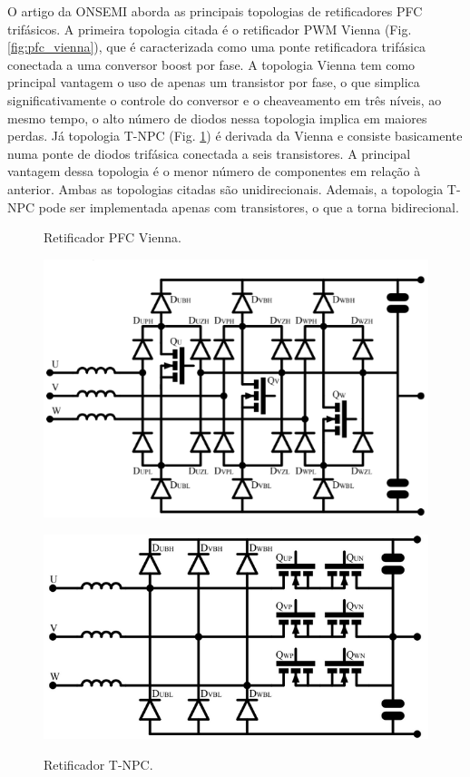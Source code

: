 O artigo da ONSEMI \cite{onsemi_h2ptoday2102} aborda as principais topologias de retificadores
PFC trifásicos. A primeira topologia citada é o retificador PWM Vienna (Fig.
\ref{fig:pfc_vienna}), que é caracterizada como uma ponte retificadora trifásica conectada a
uma conversor boost por fase. A topologia Vienna tem como principal vantagem o uso de apenas um
transistor por fase, o que simplica significativamente o controle do conversor e o cheaveamento
em três níveis, ao mesmo tempo, o alto número de diodos nessa topologia implica em maiores
perdas. Já topologia T-NPC (Fig. \ref{fig:pfc_tnpc}) é derivada da Vienna e consiste
basicamente numa ponte de diodos trifásica conectada a seis transistores. A principal vantagem
dessa topologia é o menor número de componentes em relação à anterior. Ambas as topologias
citadas são unidirecionais. Ademais, a topologia T-NPC pode ser implementada apenas com
transistores, o que a torna bidirecional.

\begin{figure}[h]
	\centering
	\begin{minipage}{0.45\textwidth}
		\centering
		\caption{Retificador PFC Vienna.}
		\includegraphics[width=\textwidth]{./Figuras/PFC_Vienna.png}
		\label{fig:pfc_vienna}
	\end{minipage}
	\hfill
	\begin{minipage}{0.45\textwidth}
		\centering
		\caption{Retificador T-NPC.}
		\includegraphics[width=\textwidth]{./Figuras/PFC_TNPC.png}
		\label{fig:pfc_tnpc}
	\end{minipage}
\end{figure}

